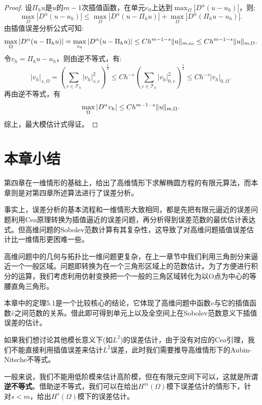 \begin{proof}
    设$\Pi_{h}u$是$u$的$m-1$次插值函数，在单元$e_{0}$上达到$\max_{\Omega}|D^{\alpha}(u-u_{h})|$，则:
    \begin{equation}
        \max_{\Omega}|D^{\alpha}(u-u_{h})|\le\max_{\Omega}|D^{\alpha}(u-\Pi_{h}u)|+\max_{\Omega}|D^{\alpha}(\Pi_{h}u-u_{h})|.
    \end{equation}
    由插值误差分析公式可知:
    \begin{equation}
        \max_{\Omega}|D^{\alpha}(u-\Pi_{h}u)|=\max_{e_{0}}|D^{\alpha}(u-\Pi_{h}u)|\le Ch^{m-1-s}\|u\|_{m,e_{0}}\le Ch^{m-1-s}\|u\|_{m,\Omega}.
    \end{equation}
    令$v_{h}=\Pi_{h}u-u_{h}$，则由逆不等式，有:
    \begin{equation}
        |v_{h}|_{s,\Omega}=\left(\sum_{e\in\mathcal{T}_{h}}|v_{h}|_{s,e}^{2}\right)^{\frac{1}{2}}\le Ch^{-s}\left(\sum_{e\in\mathcal{T}_{h}}|v_{h}|_{0,e}^{2}\right)^{\frac{1}{2}}\le Ch^{-s}|v_{h}|_{0,\Omega}.
    \end{equation}
    再由逆不等式，有
    \begin{equation}
        \max_{\Omega}|D^{\alpha}v_{h}|\le Ch^{m-1-s}\|u\|_{m,\Omega}.
    \end{equation}
    综上，最大模估计式得证。
\end{proof}
\section{本章小结}
第四章在一维情形的基础上，给出了高维情形下求解椭圆方程的有限元算法，而本章则是对第四章所述算法进行了误差分析。

事实上，误差分析的基本流程和一维情形大致相同，都是先把有限元逼近的误差问题利用Cea原理转换为插值逼近的误差问题，再分析得到误差范数的最优估计表达式。但高维问题的Sobolev范数计算有其复杂性，这导致了对高维问题插值误差估计比一维情形更困难一些。

高维问题中的几何与拓扑比一维问题更复杂，在上一章节中我们利用三角剖分来逼近一个一般区域。问题即转换为在一个三角形区域上的范数估计。为了方便进行积分的运算，我们考虑利用仿射变换把一个一般的三角区域转化为以O点为中心的等腰直角三角形。

本章中的定理5.1是一个比较核心的结论，它体现了高维问题中函数$v$与它的插值函数$\hat{v}$之间范数的关系。借此即可得到单元上以及全空间上在Sobolev范数意义下插值误差的估计。

如果我们想讨论其他模长意义下(如$L^{2}$)的误差估计，由于没有对应的Cea引理，我们不能直接利用插值误差来估计$L^{2}$误差，此时我们需要推导高维情形下的Aubin-Nitsche不等式。

一般来说，我们不能用低阶模来估计高阶模，但在有限元空间下可以，这就是所谓\textbf{逆不等式}。借助逆不等式，我们可以在给出$H^{m}(\Omega)$模下误差估计的情形下，针对$s<m$，给出$H^{s}(\Omega)$模下的误差估计。